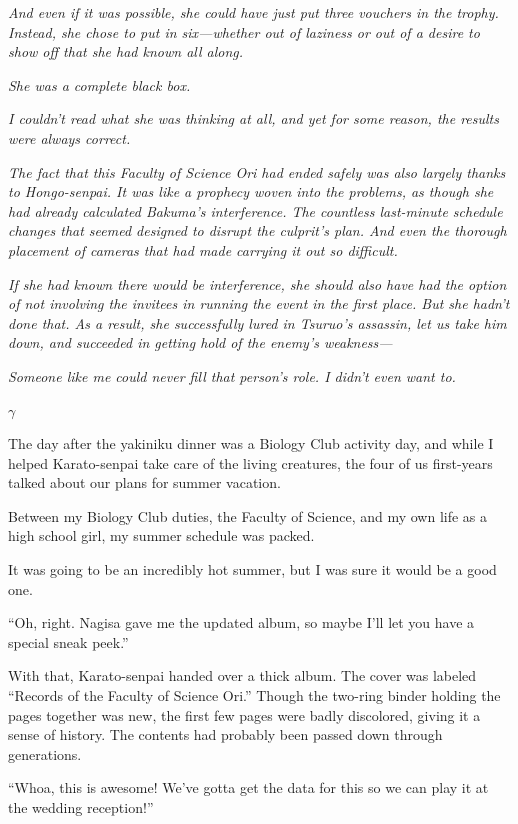 \documentclass[
    a4paper,
    12pt,
    twoside,
    openany,
    UTF8,
    fontset=windows
]{ctexbook}
\begin{document}
\textit{And even if it was possible, she could have just put three vouchers in the trophy. Instead, she chose to put in six---whether out of laziness or out of a desire to show off that she had known all along.}

\textit{She was a complete black box.}

\textit{I couldn't read what she was thinking at all, and yet for some reason, the results were always correct.}

\textit{The fact that this Faculty of Science Ori had ended safely was also largely thanks to Hongo-senpai. It was like a prophecy woven into the problems, as though she had already calculated Bakuma's interference. The countless last-minute schedule changes that seemed designed to disrupt the culprit's plan. And even the thorough placement of cameras that had made carrying it out so difficult.}

\textit{If she had known there would be interference, she should also have had the option of not involving the invitees in running the event in the first place. But she hadn't done that. As a result, she successfully lured in Tsuruo's assassin, let us take him down, and succeeded in getting hold of the enemy's weakness---}

\textit{Someone like me could never fill that person's role. I didn't even want to.}

$\gamma$

The day after the yakiniku dinner was a Biology Club activity day, and while I helped Karato-senpai take care of the living creatures, the four of us first-years talked about our plans for summer vacation.

Between my Biology Club duties, the Faculty of Science, and my own life as a high school girl, my summer schedule was packed.

It was going to be an incredibly hot summer, but I was sure it would be a good one.

``Oh, right. Nagisa gave me the updated album, so maybe I'll let you have a special sneak peek.''

With that, Karato-senpai handed over a thick album. The cover was labeled ``Records of the Faculty of Science Ori.'' Though the two-ring binder holding the pages together was new, the first few pages were badly discolored, giving it a sense of history. The contents had probably been passed down through generations.

``Whoa, this is awesome! We've gotta get the data for this so we can play it at the wedding reception!''
\end{document}
